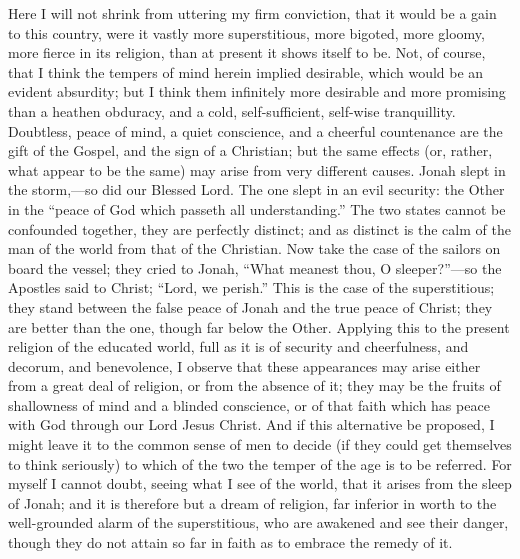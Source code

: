 Here I will not shrink from uttering my firm
conviction, that it would be a gain to this country, were
it vastly more superstitious, more bigoted, more gloomy,
more fierce in its religion, than at present it shows
itself to be. Not, of course, that I think the tempers of
mind herein implied desirable, which would be an evident
absurdity; but I think them infinitely more desirable and
more promising than a heathen obduracy, and a cold,
self-sufficient, self-wise tranquillity. Doubtless, peace
of mind, a quiet conscience, and a cheerful countenance
are the gift of the Gospel, and the sign of a Christian;
but the same effects (or, rather, what appear to be the
same) may arise from very different causes. Jonah slept
in the storm,—so did our Blessed Lord. The one slept
in an evil security: the Other in the ``peace of God
which passeth all understanding.'' The two states
cannot be confounded together, they are perfectly
distinct; and as distinct is the calm of the man of the
world from that of the Christian. Now take the case of
the sailors on board the vessel; they cried to Jonah,
``What meanest thou, O sleeper?''—so the
Apostles said to Christ; ``Lord, we perish.''
This is the case of the superstitious; they stand between
the false peace of Jonah and the true peace of Christ;
they are better than the one, though far below the Other.
Applying this to the present religion of the educated
world, full as it is of security and cheerfulness, and
decorum, and benevolence, I observe that these
appearances may arise either from a great deal of
religion, or from the absence of it; they may be the
fruits of shallowness of mind and a blinded conscience,
or of that faith which has peace with God through our
Lord Jesus Christ. And if this alternative be proposed, I
might leave it to the common sense of men to decide (if
they could get themselves to think seriously) to which of
the two the temper of the age is to be referred. For
myself I cannot doubt, seeing what I see of the world, that it arises from the sleep of Jonah; and it is
therefore but a dream of religion, far inferior in worth
to the well-grounded alarm of the superstitious, who are
awakened and see their danger, though they do not attain
so far in faith as to embrace the remedy of it.

